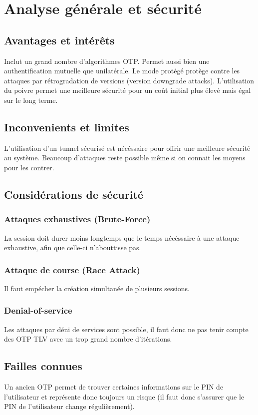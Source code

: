 \documentclass{article}
\begin{document}
\section{Analyse générale et sécurité}

\subsection{Avantages et intér\^ets}
  Inclut un grand nombre d'algorithmes OTP.
  Permet aussi bien une authentification mutuelle que unilatérale.
  Le mode protégé protège contre les attaques par rétrogradation de versions (version downgrade attacks).
  L'utilisation du poivre permet une meilleure sécurité pour un coût initial plus élevé mais égal sur le long terme.
  
  \subsection{Inconvenients et limites}
  L'utilisation d'un tunnel sécurisé est nécéssaire pour offrir une meilleure sécurité au système.
  Beaucoup d'attaques reste possible même si on connait les moyens pour les contrer.

\subsection{Considérations de sécurité}

\subsubsection{Attaques exhaustives (Brute-Force)}
    La session doit durer moins longtemps que le temps nécéssaire à une attaque exhaustive, afin que celle-ci n'abouttisse pas.

\subsubsection{Attaque de course (Race Attack)}
Il faut empécher la création simultanée de plusieurs sessions.

\subsubsection{Denial-of-service}
 Les attaques par déni de services sont possible, il faut donc ne pas tenir compte des OTP TLV avec un trop grand nombre d'itérations.

\subsection{Failles connues}
    Un ancien OTP permet de trouver certaines informations sur le PIN de l'utilisateur et représente donc toujours un risque (il faut donc s'assurer que le PIN de l'utilisateur change régulièrement).
\end{document}
